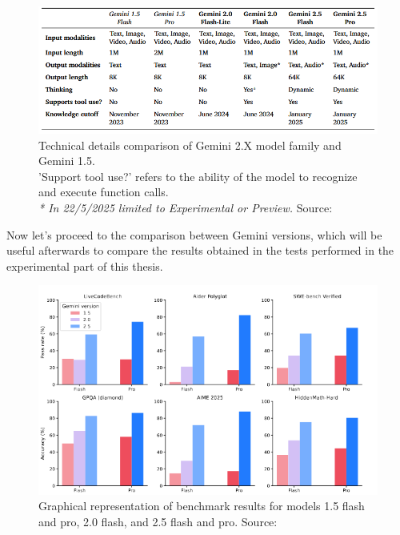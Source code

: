 \documentclass[12pt]{article}
\begin{document}
    \begin{figure}[H]
    \centering
            \includegraphics[width=1\textwidth]{GeminiGenerations.png}
    \caption[Technical details of the Gemini 2.X model family]{Technical details comparison of Gemini 2.X model family and Gemini 1.5. \\
    'Support tool use?' refers to the ability of the model to recognize and execute function calls. \\ 
    \textit{* In 22/5/2025 limited to Experimental or Preview.} Source: \cite{comanici2025gemini25pushingfrontier}}
    \end{figure}  
    
Now let's proceed to the comparison between Gemini versions, which will be useful afterwards to compare the results obtained in the tests performed in the experimental part of this thesis.\\
    
	\begin{figure}[H]
    \centering
            \includegraphics[width=1\textwidth]{GeminiBenchmarks.png}
    \caption[Graphical representation of Gemini benchmarks]{Graphical representation of benchmark results for models 1.5 flash and pro, 2.0 flash, and 2.5 flash and pro. Source: \cite{comanici2025gemini25pushingfrontier}}
    \end{figure}     
    
\end{document}
